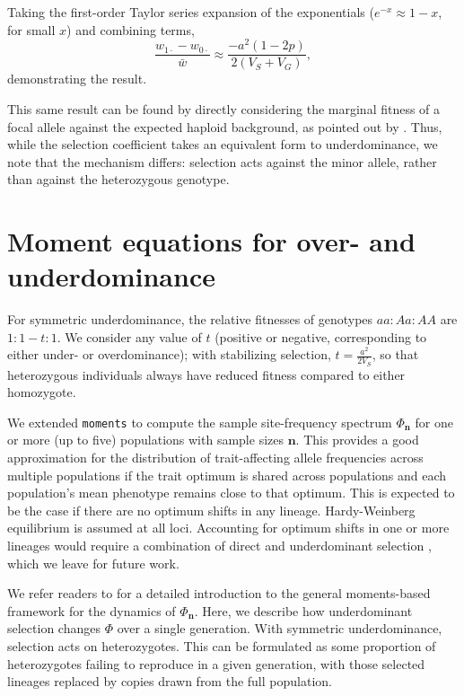 \documentclass[]{article}
\newcommand{\moments}{\texttt{moments}\xspace}
\begin{document}
Taking the first-order Taylor series expansion of the exponentials
($e^{-x}\approx1-x$, for small $x$) and combining terms,
\[
    \frac{w_{1\cdot} - w_{0\cdot}}{\bar{w}} \approx \frac{-a^2(1-2p)}{2(V_S+V_G)},
\]
demonstrating the result.

This same result can be found by directly considering the marginal fitness of a
focal allele against the expected haploid background, as pointed out by
\citet{negm2024effect}. Thus, while the selection coefficient takes an
equivalent form to underdominance, we note that the mechanism differs:
selection acts against the minor allele, rather than against the heterozygous
genotype.

\section{Moment equations for over- and underdominance}
\label{sec:moments-underdominance}

For symmetric underdominance, the relative fitnesses of genotypes \(aa:Aa:AA\)
are \(1:1-t:1\). We consider any value of $t$ (positive or negative,
corresponding to either under- or overdominance); with stabilizing selection,
\(t=\frac{a^2}{2V_S}\), so that heterozygous individuals always have reduced
fitness compared to either homozygote.

We extended \moments \citep{jouganous2017inferring} to compute the sample
site-frequency spectrum \(\Phi_{\mathbf{n}}\) for one or more (up to five)
populations with sample sizes \(\mathbf{n}\). This provides a good
approximation for the distribution of trait-affecting allele frequencies across
multiple populations if the trait optimum is shared across populations and each
population's mean phenotype remains close to that optimum. This is expected to
be the case if there are no optimum shifts in any lineage.  Hardy-Weinberg
equilibrium is assumed at all loci. Accounting for optimum shifts in one or
more lineages would require a combination of direct and underdominant selection
\citep[e.g.,][]{hayward2022polygenic}, which we leave for future work.

We refer readers to \citet{jouganous2017inferring} for a detailed introduction
to the general moments-based framework for the dynamics of \(\Phi_\mathbf{n}\).
Here, we describe how underdominant selection changes \(\Phi\) over a single
generation. With symmetric underdominance, selection acts on heterozygotes. This
can be formulated as some proportion of heterozygotes failing to reproduce in a
given generation, with those selected lineages replaced by copies drawn from
the full population.
\end{document}

